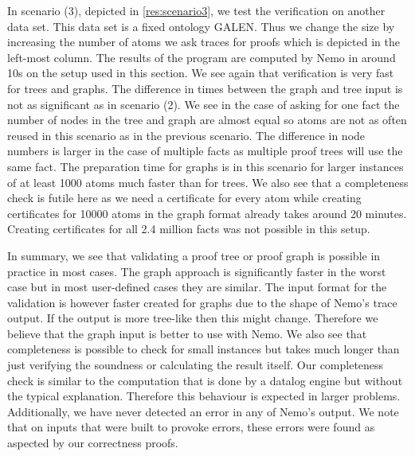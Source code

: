 In scenario (3), depicted in \cref{res:scenario3}, we test the verification on another data set. This data set is a fixed ontology GALEN. Thus we change the size by increasing the number of atoms we ask traces for proofs which is depicted in the left-most column. The results of the program are computed by Nemo in around 10s on the setup used in this section. We see again that verification is very fast for trees and graphs. The difference in times between the graph and tree input is not as significant as in scenario (2). We see in the case of asking for one fact the number of nodes in the tree and graph are almost equal so atoms are not as often reused in this scenario as in the previous scenario. The difference in node numbers is larger in the case of multiple facts as multiple proof trees will use the same fact. The preparation time for graphs is in this scenario for larger instances of at least 1000 atoms much faster than for trees. We also see that a completeness check is futile here as we need a certificate for every atom while creating certificates for 10000 atoms in the graph format already takes around 20 minutes. Creating certificates for all 2.4 million facts was not possible in this setup. 


In summary, we see that validating a proof tree or proof graph is possible in practice in most cases. The graph approach is significantly faster in the worst case but in most user-defined cases they are similar. The input format for the validation is however faster created for graphs due to the shape of Nemo's trace output. If the output is more tree-like then this might change. Therefore we believe that the graph input is better to use with Nemo. We also see that completeness is possible to check for small instances but takes much longer than just verifying the soundness or calculating the result itself. Our completeness check is similar to the computation that is done by a datalog engine but without the typical explanation. Therefore this behaviour is expected in larger problems. 
Additionally, we have never detected an error in any of Nemo's output. We note that on inputs that were built to provoke errors, these errors were found as aspected by our correctness proofs.